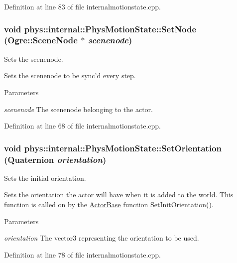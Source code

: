 Definition at line 83 of file internalmotionstate.cpp.

\hypertarget{classphys_1_1internal_1_1PhysMotionState_a22ca36a454168e74f73d297c9747d86a}{
\subsubsection[{SetNode}]{\setlength{\rightskip}{0pt plus 5cm}void phys::internal::PhysMotionState::SetNode (Ogre::SceneNode $\ast$ {\em scenenode})}}
\label{dc/df8/classphys_1_1internal_1_1PhysMotionState_a22ca36a454168e74f73d297c9747d86a}


Sets the scenenode. 

Sets the scenenode to be sync'd every step. 
\begin{DoxyParams}{Parameters}
\item[{\em scenenode}]The scenenode belonging to the actor. \end{DoxyParams}


Definition at line 68 of file internalmotionstate.cpp.

\hypertarget{classphys_1_1internal_1_1PhysMotionState_a5beba7c161a09b90b5a301585a509be6}{
\subsubsection[{SetOrientation}]{\setlength{\rightskip}{0pt plus 5cm}void phys::internal::PhysMotionState::SetOrientation ({\bf Quaternion} {\em orientation})}}
\label{dc/df8/classphys_1_1internal_1_1PhysMotionState_a5beba7c161a09b90b5a301585a509be6}


Sets the initial orientation. 

Sets the orientation the actor will have when it is added to the world. This function is called on by the \hyperlink{classphys_1_1ActorBase}{ActorBase} function SetInitOrientation(). 
\begin{DoxyParams}{Parameters}
\item[{\em orientation}]The vector3 representing the orientation to be used. \end{DoxyParams}


Definition at line 78 of file internalmotionstate.cpp.

